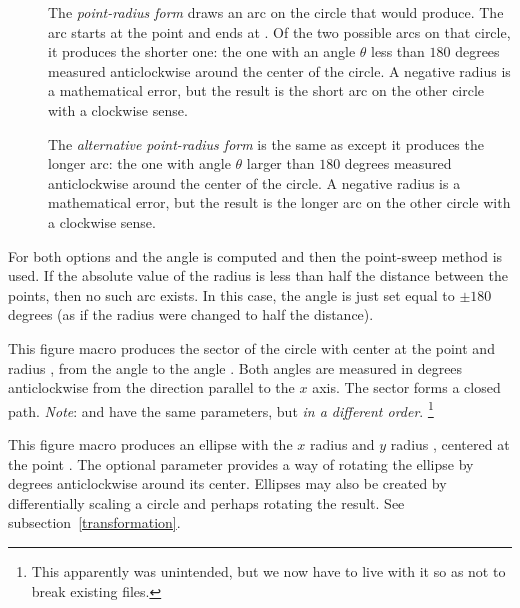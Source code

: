\documentclass[letterpaper]{article}
\begin{document}
\begin{description}
\item[] The \textit{point-radius form} draws an arc on the
circle that  would produce. The arc starts at the
point  and ends at . Of the two possible arcs on
that circle, it produces the shorter one: the one with an angle $\theta$
less than $180$ degrees measured anticlockwise around the center of the
circle. A negative radius is a mathematical error, but the result is the
short arc on the other circle with a clockwise sense.

\item[] The \textit{alternative point-radius form} is the same
as  except it produces the longer arc: the one with angle
$\theta$ larger than $180$ degrees measured anticlockwise around the
center of the circle. A negative radius is a mathematical error, but the
result is the longer arc on the other circle with a clockwise sense.
\end{description}

For both options  and  the angle is computed and then
the point-sweep method is used. If the absolute value of the radius is
less than half the distance between the points, then no such arc exists.
In this case, the angle is just set equal to $\pm180$ degrees (as if the
radius were changed to half the distance).

\begin{cd}
%
%
\end{cd}

This figure macro produces the sector of the circle with center at the
point  and radius , from the angle 
to the angle . Both angles are measured in degrees
anticlockwise from the direction parallel to the $x$ axis. The sector
forms a closed path. \emph{Note}:  and  have
the same parameters, but \emph{in a different order}.%
    \footnote{This apparently was unintended, but we now have to live
    with it so as not to break existing  files.}


\begin{cd}
\oarg{\meta{$\theta$}}%
%
\end{cd}

This figure macro produces an ellipse with the $x$ radius 
and $y$ radius , centered at the point . The
optional parameter \meta{$\theta$} provides a way of rotating the
ellipse by \meta{$\theta$} degrees anticlockwise around its center.
Ellipses may also be created by differentially scaling a circle and
perhaps rotating the result. See subsection~\ref{transformation}.
\end{document}
